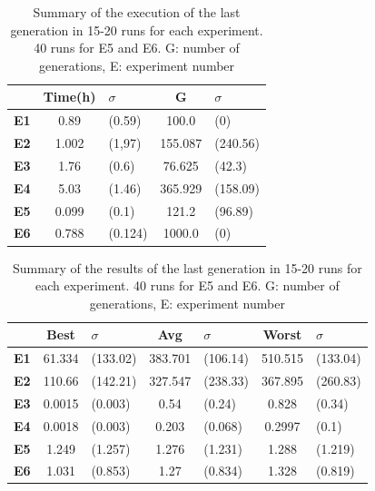 \documentclass[a4paper,twoside]{article}
\newcommand{\myfloatalign}{\centering}
\begin{document}
\begin{table}
	\myfloatalign
	\begin{tabular}{cclcl}
		& \textbf{Time(h)} &$\sigma$ & \textbf{G}& $\sigma$ \\ \hline
		\textbf{E1}&0.89&(0.59)&100.0&(0)\\  \hline
		\textbf{E2}&1.002&(1,97)&155.087&(240.56) \\  \hline
		\textbf{E3}&1.76&(0.6)&76.625&(42.3)\\  \hline
		\textbf{E4}&5.03&(1.46)&365.929&(158.09)  \\  \hline
		\textbf{E5}&0.099&(0.1)&121.2&(96.89)     \\  \hline 
		\textbf{E6}&0.788&(0.124)&1000.0&(0) \\  \hline
		\hline
	\end{tabular}
	\caption{Summary of the execution of the last generation in 15-20 runs for each
		experiment. 40 runs for E5 and E6.
		G: number of generations, E: experiment 
		number} %
	\label{t:resOver1}
\end{table}

\begin{table}
	\myfloatalign
	\begin{tabular}{cclclcl}
		& \textbf{Best}& $\sigma$  &\textbf{Avg}&$\sigma$  & \textbf{Worst}&$\sigma$ \\ \hline
		\textbf{E1}&61.334&(133.02)&383.701&(106.14)&510.515&(133.04)\\  \hline
		\textbf{E2}&110.66&(142.21)&327.547&(238.33)&367.895&(260.83)  \\  \hline
		\textbf{E3}&0.0015&(0.003)&0.54&(0.24)&0.828&(0.34)   \\  \hline
		\textbf{E4}&0.0018&(0.003)&0.203&(0.068)&0.2997&(0.1)  \\  \hline
		\textbf{E5}& 1.249&(1.257)&1.276&(1.231)&1.288&(1.219)     \\  \hline 
		\textbf{E6}& 1.031&(0.853)&1.27&(0.834)&1.328&(0.819) \\  \hline
		\hline
	\end{tabular}
	\caption{Summary of the results of the last generation in 15-20 runs for each
		experiment. 40 runs for E5 and E6.
		G: number of generations, E: experiment 
		number} %
	\label{t:resOver2}
\end{table}
\end{document}
